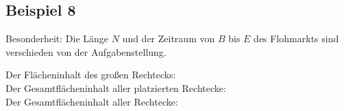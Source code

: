 \subsection{Beispiel 8}\label{ex:8}
Besonderheit: Die Länge $N$ und der Zeitraum von $B$ bis $E$ des Flohmarkts sind
verschieden von der Aufgabenstellung. 
\vspace{.4cm}

\noindent Der Flächeninhalt des großen Rechtecks: \\
Der Gesamtflächeninhalt aller platzierten Rechtecke: \\
Der Gesamtflächeninhalt aller Rechtecke: 